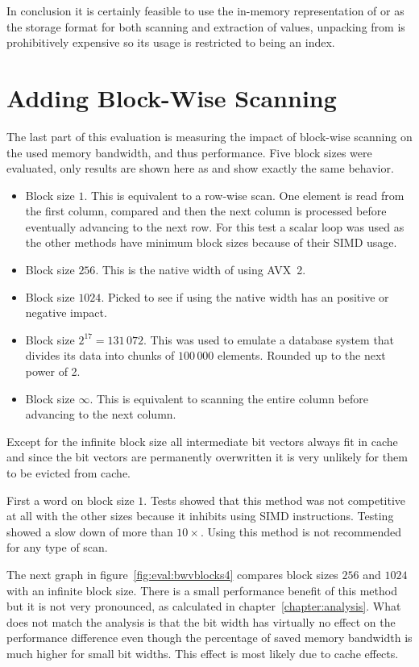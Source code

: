In conclusion it is certainly feasible to use the in-memory representation of
\simdscan{} or \bs{} as the storage format for both scanning and extraction of
values, unpacking from \bwv{} is prohibitively expensive so its usage is
restricted to being an index.

\section{Adding Block-Wise Scanning}

The last part of this evaluation is measuring the impact of block-wise scanning
on the used memory bandwidth, and thus performance. Five block sizes were
evaluated, only \bwv{} results are shown here as \simdscan{} and \bs{} show
exactly the same behavior.

\begin{itemize}
  \item Block size $1$. This is equivalent to a row-wise scan. One element is read
    from the first column, compared and then the next column is processed before
    eventually advancing to the next row. For this test a scalar loop was used
    as the other methods have minimum block sizes because of their SIMD usage.
  \item Block size $256$. This is the native width of \bwv{} using AVX~2.
  \item Block size $1024$. Picked to see if using the native width has an
    positive or negative impact.
  \item Block size $2^{17}=131\,072$. This was used to emulate a database system
    that divides its data into chunks of $100\,000$ elements. Rounded up to the
    next power of 2.
  \item Block size $\infty$. This is equivalent to scanning the entire column
    before advancing to the next column.
\end{itemize}

Except for the infinite block size all intermediate bit vectors always fit in
cache and since the bit vectors are permanently overwritten it is very unlikely
for them to be evicted from cache.

First a word on block size $1$. Tests showed that this method was not
competitive at all with the other sizes because it inhibits using SIMD
instructions. Testing showed a slow down of more than $10\times$. Using this
method is not recommended for any type of scan.

The next graph in figure~\ref{fig:eval:bwvblocks4} compares block sizes $256$
and $1024$ with an infinite block size. There is a small performance benefit of
this method but it is not very pronounced, as calculated in
chapter~\ref{chapter:analysis}. What does not match the analysis is that the
bit width has virtually no effect on the performance difference even though the
percentage of saved memory bandwidth is much higher for small bit widths. This
effect is most likely due to cache effects.

